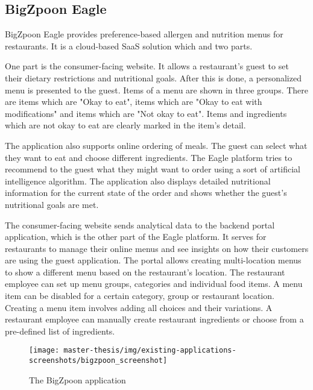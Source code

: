 \subsection*{BigZpoon Eagle}
  BigZpoon Eagle provides preference-based allergen and nutrition menus for \linebreak restaurants.
  It is a cloud-based SaaS solution which and two parts.

  One part is the consumer-facing website.
  It allows a restaurant's guest to set their dietary restrictions and nutritional goals.
  After this is done, a personalized menu is presented to the guest.
  Items of a menu are shown in three groups.
  There are items which are "Okay to eat", items which are "Okay to eat with modifications" and items which are "Not okay to eat".
  Items and ingredients which are not okay to eat are clearly marked in the item's detail.
  
  The application also supports online ordering of meals.
  The guest can select what they want to eat and choose different ingredients.
  The Eagle platform tries to recommend to the guest what they might want to order using a sort of artificial intelligence algorithm.
  The application also displays detailed nutritional information for the current state of the order and shows whether the guest's nutritional goals are met.

  The consumer-facing website sends analytical data to the backend portal application, which is the other part of the Eagle platform.
  It serves for restaurants to manage their online menus and see insights on how their customers are using the guest application.
  The portal allows creating multi-location menus to show a different menu based on the restaurant's location.
  The restaurant employee can set up menu groups, categories and individual food items.
  A menu item can be disabled for a certain category, group or restaurant location.
  Creating a menu item involves adding all choices and their variations.
  A restaurant employee can manually create restaurant ingredients or choose from a pre-defined list of ingredients.

  \begin{figure}[h]
    \centering
    \texttt{[image: master-thesis/img/existing-applications-screenshots/bigzpoon\_screenshot]}
    \caption{The BigZpoon application}
  \end{figure}

